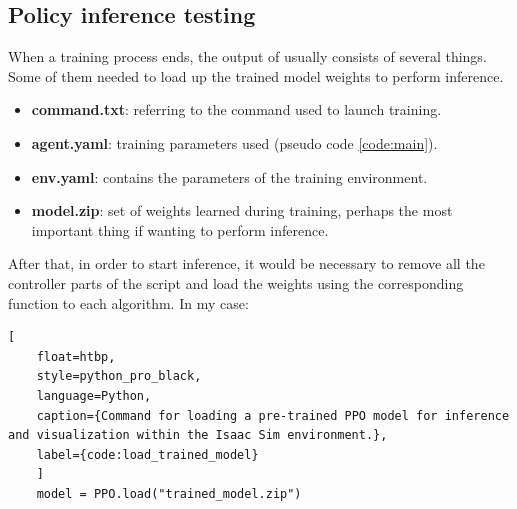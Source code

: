 \subsection{Policy inference testing}
When a training process ends, the output of usually consists of several things. Some of them needed to load up the trained model weights to perform inference.

\begin{itemize}
	\item \textbf{command.txt}: referring to the command used to launch training.
	
	\item \textbf{agent.yaml}: training parameters used (pseudo code \ref{code:main}).
	
	\item \textbf{env.yaml}: contains the parameters of the training environment.
	
	\item \textbf{model.zip}: set of weights learned during training, perhaps the most important thing if wanting to perform inference. 
\end{itemize}

After that, in order to start inference, it would be necessary to remove all the controller parts of the script and load the weights using the corresponding function to each algorithm. In my case: 

\begin{lstlisting}[
	float=htbp, 
	style=python_pro_black,
	language=Python, 
	caption={Command for loading a pre-trained PPO model for inference and visualization within the Isaac Sim environment.},
	label={code:load_trained_model}
	]
	model = PPO.load("trained_model.zip")
\end{lstlisting}